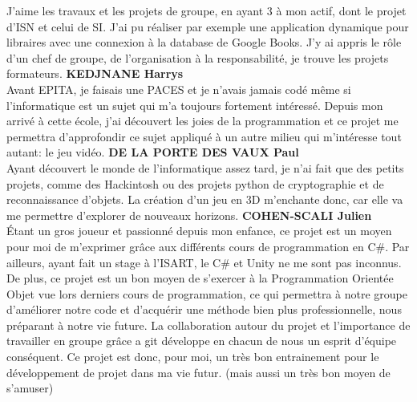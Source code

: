 \documentclass[french, 12pt]{article}
\begin{document}
J'aime les travaux et les projets de groupe, en ayant 3 à mon actif, dont le projet d'ISN et celui de SI. J'ai pu réaliser par exemple une application dynamique pour libraires avec une connexion à la database de Google Books.
J'y ai appris le rôle d'un chef de groupe, de l'organisation à la responsabilité, je trouve les projets formateurs.
\newline
\textbf{KEDJNANE Harrys} \\
Avant EPITA, je faisais une PACES et je n’avais jamais codé 
même si l’informatique est un sujet qui m’a toujours fortement intéressé. 
Depuis mon arrivé à cette école, j’ai découvert les joies de la programmation 
et ce projet me permettra d’approfondir ce sujet appliqué à un autre milieu 
qui m’intéresse tout autant: le jeu vidéo. 
\newline
\textbf{DE LA PORTE DES VAUX Paul} \\
Ayant découvert le monde de l’informatique assez tard, je n’ai fait que des petits projets, comme des Hackintosh ou des projets python de cryptographie et de reconnaissance d’objets.
La création d’un jeu en 3D m’enchante donc, car elle va me permettre d’explorer de nouveaux horizons.
\newline
\textbf{COHEN-SCALI Julien} \\
Étant un gros joueur et passionné depuis mon enfance, ce projet est un moyen pour moi de m’exprimer grâce aux différents cours de programmation en C\#.
Par ailleurs, ayant fait un stage à l’ISART, le C\# et Unity ne me sont pas inconnus. De plus, ce projet est un bon moyen de s’exercer à la Programmation Orientée Objet vue lors derniers cours de programmation,
ce qui permettra à notre groupe d’améliorer notre code et d’acquérir une méthode bien plus professionnelle, nous préparant à notre vie future.
La collaboration autour du projet et l’importance de travailler en groupe grâce a git développe en chacun de nous un esprit d’équipe conséquent.
Ce projet est donc, pour moi, un très bon entrainement pour le développement de projet dans ma vie futur. (mais aussi un très bon moyen de s’amuser)
\end{document}
